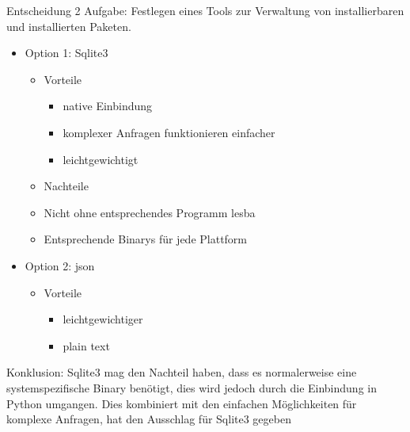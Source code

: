 Entscheidung 2
Aufgabe: Festlegen eines Tools zur Verwaltung von installierbaren und installierten Paketen.

\begin{itemize}
    \item Option 1: Sqlite3
    \begin{itemize}
        \item Vorteile
        \begin{itemize}
            \item native Einbindung
            \item komplexer Anfragen funktionieren einfacher
            \item leichtgewichtigt
        \end{itemize}
        \item Nachteile
            \item Nicht ohne entsprechendes Programm lesba
            \item Entsprechende Binarys für jede Plattform
    \end{itemize}
     \item Option 2: json  
    \begin{itemize}
        \item Vorteile
        \begin{itemize}
            \item leichtgewichtiger
            \item plain text
        \end{itemize}
    \end{itemize}
\end{itemize}

Konklusion: Sqlite3 mag den Nachteil haben, dass es normalerweise eine systemspezifische
Binary benötigt, dies wird jedoch durch die Einbindung in Python umgangen. Dies kombiniert
mit den einfachen Möglichkeiten für komplexe Anfragen, hat den Ausschlag für Sqlite3
gegeben

    